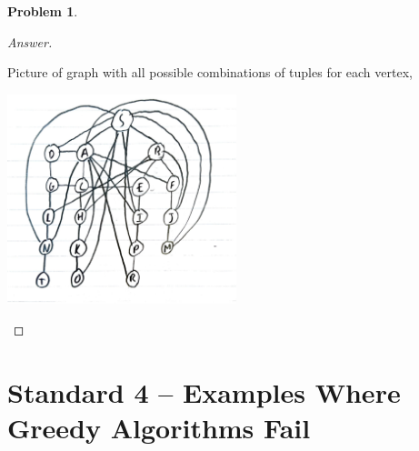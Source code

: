 \documentclass[11pt]{article}
\theoremstyle{definition}
\theoremstyle{definition}
\newtheorem{required}{Problem}
\theoremstyle{definition}
\begin{document}
\begin{required}
\begin{enumerate}[label=(\alph*)]
\begin{proof}[Answer]
\begin{center}
\end{center}

Picture of graph with all possible combinations of tuples for each vertex, \\
\begin{center}
\includegraphics[width=0.5\textwidth,angle=360]{CSCI3104_HW2_Q2PC.pdf} \\
\end{center}


	\end{proof}
\end{enumerate}
\end{required}

\clearpage
\section{Standard 4 -- Examples Where Greedy Algorithms Fail}

\setcounter{subsection}{2}
\end{document}
